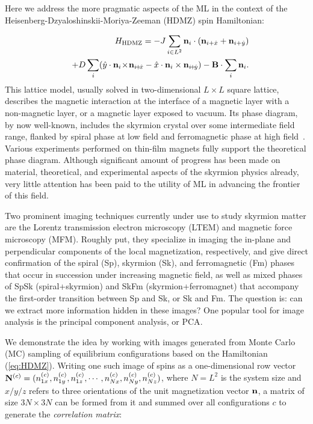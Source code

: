 \documentclass[reprint,amsmath,amssymb,aps,showpacs,superscriptaddress,prl]{revtex4-1}
\newcommand{\ba}{\begin{eqnarray}}
\newcommand{\ea}{\end{eqnarray}}
\renewcommand{\v}[1]{{\bf #1}}
\newcommand{\nn}{\nonumber \\}
\begin{document}
Here we address the more pragmatic aspects of the ML in the context of the
Heisenberg-Dzyaloshinskii-Moriya-Zeeman (HDMZ) spin Hamiltonian:


\ba && H_{\rm HDMZ} = -J \sum_{i\in L^2} \v n_i \cdot (\v n_{i+\hat{x}} + \v n_{i+\hat{y}} ) \nn
 & & + D \sum_i ( \hat{y} \cdot \v n_i \! \times \! \v n_{i\! +\! \hat{x}} - \hat{x} \cdot \v n_i \times \v n_{i\! +\! \hat{y}} )  - \v B \cdot \sum_i \v n_i .  \label{eq:HDMZ} \ea
%
This lattice model, usually solved in two-dimensional $L\times L$ square lattice, describes the magnetic interaction at the interface of a magnetic layer with a non-magnetic layer, or a magnetic layer exposed to vacuum. Its phase diagram, by now well-known, includes the skyrmion crystal over some intermediate field range, flanked by spiral phase at low field and ferromagnetic phase at high field~\cite{nagaosa-review,skyrmion-book,jiang-review,fert-review,han-book}. Various experiments performed on thin-film magnets fully support the theoretical phase diagram. Although significant amount of progress has been made on material, theoretical, and experimental aspects of the skyrmion physics already, very little attention has been paid to the utility of ML in advancing the frontier of this field.

Two prominent imaging techniques currently under use to study skyrmion matter are the Lorentz transmission electron microscopy (LTEM)\cite{tokura10} and magnetic force microscopy (MFM)\cite{pana17}. Roughly put, they specialize in imaging the in-plane and perpendicular components of the local magnetization, respectively, and give direct confirmation of the spiral (Sp), skyrmion (Sk), and ferromagnetic (Fm) phases that occur in succession under increasing magnetic field, as well as mixed phases of SpSk (spiral+skyrmion) and SkFm (skyrmion+ferromagnet) that accompany the first-order transition between Sp and Sk, or Sk and Fm. The question is: can we extract more information hidden in these images?  One popular tool for image analysis is the principal component analysis, or PCA\cite{PCA}.

We demonstrate the idea by working with images generated from Monte Carlo (MC) sampling of equilibrium configurations based on the Hamiltonian (\ref{eq:HDMZ}). Writing one such image of spins as a one-dimensional row vector $\v N^{(c)} = (n_{1x}^{(c)}, n_{1y}^{(c)}, n_{1z}^{(c)}, \cdots, n_{Nx}^{(c)}, n_{Ny}^{(c)}, n_{Nz}^{(c)})$, where $N=L^2$ is the system size and $x/y/z$ refers to three orientations of the unit magnetization vector $\v n$, a matrix of size $3N\times 3N$ can be formed from it and summed over all configurations $c$ to generate the {\it correlation matrix}:
\end{document}

